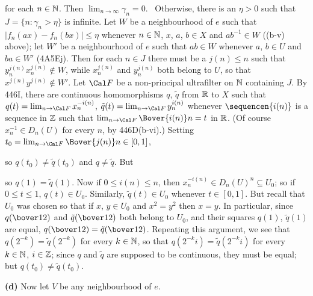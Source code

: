 {

\noindent for each $n\in\Bbb N$.   Then $\lim_{n\to\infty}\gamma_n=0$.
\Prf\Quer\ Otherwise, there is an $\eta>0$ such that
$J=\{n:\gamma_n>\eta\}$ is infinite.   Let $W$ be a neighbourhood of $e$
such that $|f_n(ax)-f_n(bx)|\le\eta$ whenever $n\in\Bbb N$, $x$, $a$,
$b\in X$ and
$ab^{-1}\in W$ ((b-v) above);  let $W'$ be a neighbourhood of $e$ such
that $ab\in W$ whenever $a$, $b\in U$ and $ba\in W'$ (4A5Ej).
Then for each $n\in J$ there must be a
$j(n)\le n$ such that $y_n^{j(n)}x_n^{j(n)}\notin W$, while $x_n^{j(n)}$
and $y_n^{j(n)}$ both belong to $U$, so that
$x^{j(n)}y^{j(n)}\notin W'$.   Let $\Cal F$ be
a non-principal ultrafilter on $\Bbb N$ containing $J$.   By 446I, there
are continuous homomorphisms $q$, $\tilde q$ from $\Bbb R$ to $X$ such
that $q(t)=\lim_{n\to\Cal F}x_n^{-i(n)}$,
$\tilde q(t)=\lim_{n\to\Cal F}y_n^{i(n)}$ whenever $\sequencen{i(n)}$
is a sequence in $\Bbb Z$ such
that $\lim_{n\to\Cal F}\Bover{i(n)}n=t$ in $\Bbb R$.   (Of course $x_n^{-1}\in
D_n(U)$ for every $n$, by 446D(b-vi).)   Setting
$t_0=\lim_{n\to\Cal F}\Bover{j(n)}n\in[0,1]$,


\noindent so $q(t_0)\ne \tilde q(t_0)$ and $q\ne\tilde q$.   But


\noindent so $q(1)=\tilde q(1)$.   Now if $0\le i(n)\le n$, then
$x_n^{-i(n)}\in D_n(U)^n\subseteq U_0$;  so if $0\le t\le 1$, $q(t)\in
U_0$.   Similarly, $\tilde q(t)\in U_0$ whenever $t\in[0,1]$.   But
recall that $U_0$ was chosen so that if $x$, $y\in U_0$ and $x^2=y^2$
then $x=y$.   In particular, since $q(\bover12)$ and $\tilde
q(\bover12)$ both belong to $U_0$, and their squares $q(1)$, $\tilde
q(1)$ are equal, $q(\bover12)=\tilde q(\bover12)$.   Repeating this
argument, we see that $q(2^{-k})=\tilde q(2^{-k})$ for every $k\in\Bbb
N$, so that $q(2^{-k}i)=\tilde q(2^{-k}i)$ for every $k\in\Bbb N$,
$i\in\Bbb Z$;  since $q$ and $\tilde q$ are supposed to be continuous,
they must be equal;  but $q(t_0)\ne\tilde q(t_0)$.\ \Bang\Qed

\medskip

{\bf (d)} Now let $V$ be any neighbourhood of $e$.

}
